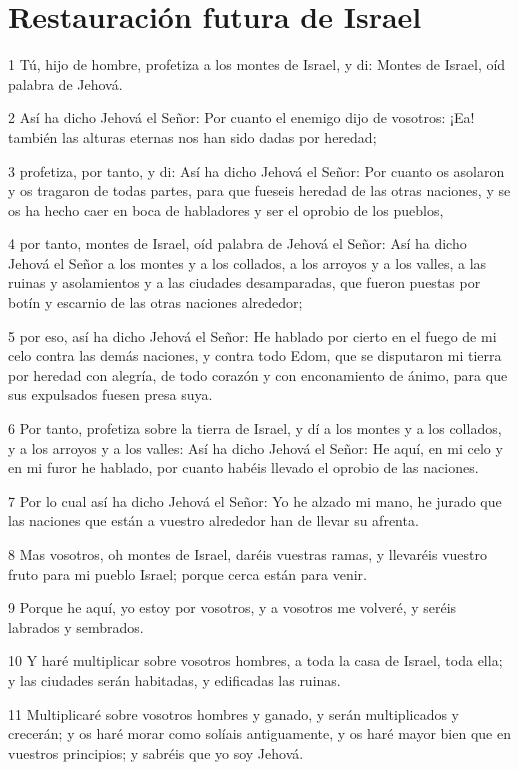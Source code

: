 \section*{Restauración futura de Israel}

\par 1 Tú, hijo de hombre, profetiza a los montes de Israel, y di: Montes de Israel, oíd palabra de Jehová.
\par 2 Así ha dicho Jehová el Señor: Por cuanto el enemigo dijo de vosotros: ¡Ea! también las alturas eternas nos han sido dadas por heredad;
\par 3 profetiza, por tanto, y di: Así ha dicho Jehová el Señor: Por cuanto os asolaron y os tragaron de todas partes, para que fueseis heredad de las otras naciones, y se os ha hecho caer en boca de habladores y ser el oprobio de los pueblos,
\par 4 por tanto, montes de Israel, oíd palabra de Jehová el Señor: Así ha dicho Jehová el Señor a los montes y a los collados, a los arroyos y a los valles, a las ruinas y asolamientos y a las ciudades desamparadas, que fueron puestas por botín y escarnio de las otras naciones alrededor;
\par 5 por eso, así ha dicho Jehová el Señor: He hablado por cierto en el fuego de mi celo contra las demás naciones, y contra todo Edom, que se disputaron mi tierra por heredad con alegría, de todo corazón y con enconamiento de ánimo, para que sus expulsados fuesen presa suya.
\par 6 Por tanto, profetiza sobre la tierra de Israel, y dí a los montes y a los collados, y a los arroyos y a los valles: Así ha dicho Jehová el Señor: He aquí, en mi celo y en mi furor he hablado, por cuanto habéis llevado el oprobio de las naciones.
\par 7 Por lo cual así ha dicho Jehová el Señor: Yo he alzado mi mano, he jurado que las naciones que están a vuestro alrededor han de llevar su afrenta.
\par 8 Mas vosotros, oh montes de Israel, daréis vuestras ramas, y llevaréis vuestro fruto para mi pueblo Israel; porque cerca están para venir.
\par 9 Porque he aquí, yo estoy por vosotros, y a vosotros me volveré, y seréis labrados y sembrados.
\par 10 Y haré multiplicar sobre vosotros hombres, a toda la casa de Israel, toda ella; y las ciudades serán habitadas, y edificadas las ruinas.
\par 11 Multiplicaré sobre vosotros hombres y ganado, y serán multiplicados y crecerán; y os haré morar como solíais antiguamente, y os haré mayor bien que en vuestros principios; y sabréis que yo soy Jehová.
